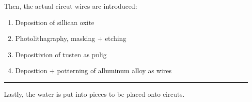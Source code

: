 \documentclass[letterpaper]{article}
\begin{document}
Then, the actual circut wires are introduced:

\begin{enumerate}
\item Deposition of sillican oxite
\item Photolithagraphy, masking + etching
\item Depositivion of tusten as pulig
\item Deposition + potterning of alluminum alloy as wires
\end{enumerate}

\noindent\rule{\textwidth}{0.5pt}

Lastly, the water is put into pieces to be placed onto circuts.
\end{document}
